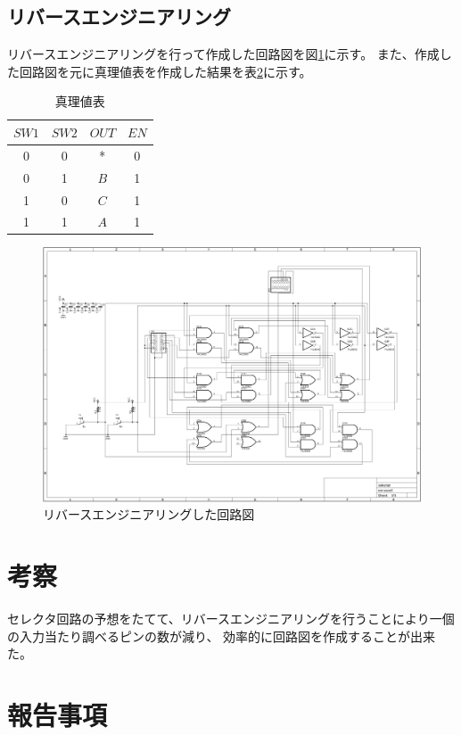 \documentclass[a4paper,11pt]{ltjsarticle}
\begin{document}
\begin{table}[h]
\begin{tabular}{|c|c|c|c|c|}
\begin{minipage}{0.15\columnwidth}
    \end{minipage} \\
    \hline
  \end{tabular} 
  \label{tab:selector}
\end{table}
\subsection{リバースエンジニアリング}
リバースエンジニアリングを行って作成した回路図を図\ref{fig:reverse}に示す。
また、作成した回路図を元に真理値表を作成した結果を表\ref{tab:a}に示す。
\begin{table}[htbp]
  \centering
  \caption{真理値表}
  \begin{tabular}{|cc|cc|}
    \hline
    $SW1$  & $SW2$  &  $OUT$ & $EN$\\
    \hline
    0 & 0 &* & 0 \\
    0 & 1 &$B$ &1 \\
    1 & 0 &$C$ &1 \\
    1 & 1 &$A$ &1 \\
    \hline
  \end{tabular}
  \label{tab:a}
\end{table}
\begin{figure}
  \centering
  \includegraphics[angle = 90 , width =0.9\columnwidth]{./image/circuit.png}
  \caption{リバースエンジニアリングした回路図}
  \label{fig:reverse}
\end{figure}
\newpage
\section{考察}
セレクタ回路の予想をたてて、リバースエンジニアリングを行うことにより一個の入力当たり調べるピンの数が減り、
効率的に回路図を作成することが出来た。
\section{報告事項}
\end{document}
